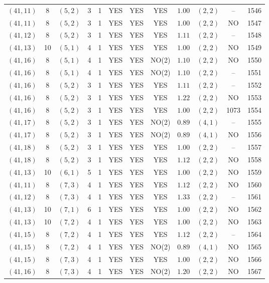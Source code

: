 \begin{longtable}{|c|c|c|c|c|c|c|c|c|c|c|c|}
$(41,11)$ & 8 & $(5,2)$ & 3 & 1 & YES & YES & YES & $1.00$ & $(2,2)$ & -- & 1546\\
$(41,11)$ & 8 & $(5,2)$ & 3 & 1 & YES & YES & YES & $1.00$ & $(2,2)$ & NO & 1547\\
$(41,12)$ & 8 & $(5,2)$ & 3 & 1 & YES & YES & YES & $1.11$ & $(2,2)$ & -- & 1548\\
$(41,13)$ & 10 & $(5,1)$ & 4 & 1 & YES & YES & YES & $1.00$ & $(2,2)$ & NO & 1549\\
$(41,16)$ & 8 & $(5,1)$ & 4 & 1 & YES & YES & NO(2) & $1.10$ & $(2,2)$ & NO & 1550\\
$(41,16)$ & 8 & $(5,1)$ & 4 & 1 & YES & YES & NO(2) & $1.10$ & $(2,2)$ & -- & 1551\\
$(41,16)$ & 8 & $(5,2)$ & 3 & 1 & YES & YES & YES & $1.11$ & $(2,2)$ & -- & 1552\\
$(41,16)$ & 8 & $(5,2)$ & 3 & 1 & YES & YES & YES & $1.22$ & $(2,2)$ & NO & 1553\\
$(41,16)$ & 8 & $(5,2)$ & 3 & 1 & YES & YES & YES & $1.00$ & $(2,2)$ & 1073 & 1554\\
$(41,17)$ & 8 & $(5,2)$ & 3 & 1 & YES & YES & NO(2) & $0.89$ & $(4,1)$ & -- & 1555\\
$(41,17)$ & 8 & $(5,2)$ & 3 & 1 & YES & YES & NO(2) & $0.89$ & $(4,1)$ & NO & 1556\\
$(41,18)$ & 8 & $(5,2)$ & 3 & 1 & YES & YES & YES & $1.00$ & $(2,2)$ & -- & 1557\\
$(41,18)$ & 8 & $(5,2)$ & 3 & 1 & YES & YES & YES & $1.12$ & $(2,2)$ & NO & 1558\\
$(41,13)$ & 10 & $(6,1)$ & 5 & 1 & YES & YES & YES & $1.00$ & $(2,2)$ & NO & 1559\\
$(41,11)$ & 8 & $(7,3)$ & 4 & 1 & YES & YES & YES & $1.12$ & $(2,2)$ & NO & 1560\\
$(41,12)$ & 8 & $(7,3)$ & 4 & 1 & YES & YES & YES & $1.33$ & $(2,2)$ & -- & 1561\\
$(41,13)$ & 10 & $(7,1)$ & 6 & 1 & YES & YES & YES & $1.00$ & $(2,2)$ & NO & 1562\\
$(41,13)$ & 10 & $(7,2)$ & 4 & 1 & YES & YES & YES & $1.00$ & $(2,2)$ & NO & 1563\\
$(41,15)$ & 8 & $(7,2)$ & 4 & 1 & YES & YES & YES & $1.12$ & $(2,2)$ & -- & 1564\\
$(41,15)$ & 8 & $(7,2)$ & 4 & 1 & YES & YES & NO(2) & $0.89$ & $(4,1)$ & NO & 1565\\
$(41,15)$ & 8 & $(7,3)$ & 4 & 1 & YES & YES & YES & $1.00$ & $(2,2)$ & NO & 1566\\
$(41,16)$ & 8 & $(7,3)$ & 4 & 1 & YES & YES & NO(2) & $1.20$ & $(2,2)$ & NO & 1567\\

\end{longtable}
